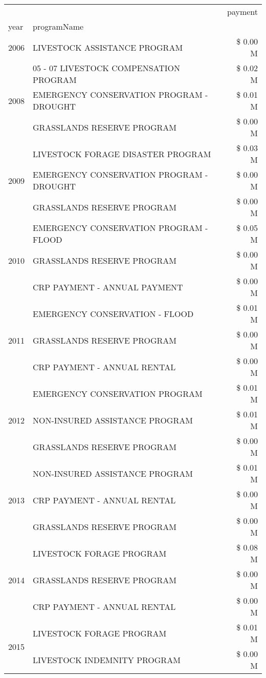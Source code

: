 \begin{tabular}{llr}
\toprule
 &  & payment \\
year & programName &  \\
\midrule
2006 & LIVESTOCK ASSISTANCE PROGRAM & \$ 0.00 M \\
\cline{1-3}
\multirow[t]{3}{*}{2008} & 05 - 07 LIVESTOCK COMPENSATION PROGRAM & \$ 0.02 M \\
 & EMERGENCY CONSERVATION PROGRAM - DROUGHT & \$ 0.01 M \\
 & GRASSLANDS RESERVE PROGRAM & \$ 0.00 M \\
\cline{1-3}
\multirow[t]{3}{*}{2009} & LIVESTOCK FORAGE DISASTER  PROGRAM & \$ 0.03 M \\
 & EMERGENCY CONSERVATION PROGRAM - DROUGHT & \$ 0.00 M \\
 & GRASSLANDS RESERVE PROGRAM & \$ 0.00 M \\
\cline{1-3}
\multirow[t]{3}{*}{2010} & EMERGENCY CONSERVATION PROGRAM - FLOOD & \$ 0.05 M \\
 & GRASSLANDS RESERVE PROGRAM & \$ 0.00 M \\
 & CRP PAYMENT - ANNUAL PAYMENT & \$ 0.00 M \\
\cline{1-3}
\multirow[t]{3}{*}{2011} & EMERGENCY CONSERVATION - FLOOD & \$ 0.01 M \\
 & GRASSLANDS RESERVE PROGRAM & \$ 0.00 M \\
 & CRP PAYMENT - ANNUAL RENTAL & \$ 0.00 M \\
\cline{1-3}
\multirow[t]{3}{*}{2012} & EMERGENCY CONSERVATION PROGRAM & \$ 0.01 M \\
 & NON-INSURED ASSISTANCE PROGRAM & \$ 0.01 M \\
 & GRASSLANDS RESERVE PROGRAM & \$ 0.00 M \\
\cline{1-3}
\multirow[t]{3}{*}{2013} & NON-INSURED ASSISTANCE PROGRAM & \$ 0.01 M \\
 & CRP PAYMENT - ANNUAL RENTAL & \$ 0.00 M \\
 & GRASSLANDS RESERVE PROGRAM & \$ 0.00 M \\
\cline{1-3}
\multirow[t]{3}{*}{2014} & LIVESTOCK FORAGE PROGRAM & \$ 0.08 M \\
 & GRASSLANDS RESERVE PROGRAM & \$ 0.00 M \\
 & CRP PAYMENT - ANNUAL RENTAL & \$ 0.00 M \\
\cline{1-3}
\multirow[t]{3}{*}{2015} & LIVESTOCK FORAGE PROGRAM & \$ 0.01 M \\
 & LIVESTOCK INDEMNITY PROGRAM & \$ 0.00 M \\

\end{tabular}
